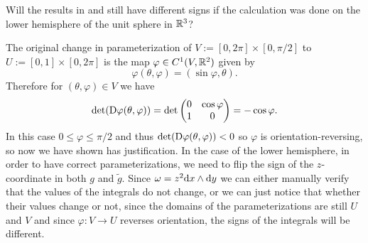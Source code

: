 \documentclass[11pt,a4paper]{article}
\begin{document}
\begin{exercise}
  Will the results
  in  and 
  still have different signs if the calculation was done on the
  lower hemisphere of the unit sphere in $\mathbb{R}^3$?
\end{exercise}
\begin{solution}
  The original change in parameterization
  of $V := [0,2\pi] \times [0,\pi/2]$
  to $U := [0,1] \times [0,2\pi]$ is the map $\varphi \in C^1(V,\mathbb{R}^2)$
  given by
  \[
    \varphi(\theta,\varphi) = (\sin\varphi,\theta).
  \]
  Therefore for $(\theta,\varphi) \in V$ we have
  \[
    \det(\mathrm{D} \varphi(\theta,\varphi)) =
    \det
    \begin{pmatrix}
      0 & \cos\varphi \\
      1 & 0
    \end{pmatrix} =
    -\cos\varphi.
  \]
  In this case $0 \le \varphi \le \pi/2$ and thus
  $\det(\mathrm{D} \varphi(\theta,\varphi)) < 0$
  so $\varphi$ is orientation-reversing,
  so now we have shown  has justification.
  In the case of the lower hemisphere,
  in order to have correct parameterizations, we need to flip
  the sign of the $z$-coordinate in both $g$ and $\tilde g$.
  Since $\omega = z^2 \dx \wedge \dy$ we can either manually
  verify that the values of the integrals do not change,
  or we can just notice that whether their values change or not,
  since the domains of the parameterizations
  are still $U$ and $V$ and since $\varphi \colon V \to U$
  reverses orientation, the signs of the integrals will be different.
\end{solution}
\end{document}
